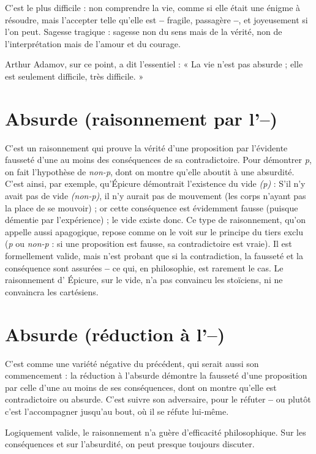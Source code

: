 C’est le plus difficile : non comprendre la vie, comme si elle était une
énigme à résoudre, mais l’accepter telle qu’elle est {\bf --} fragile, passagère {\bf --}, et
joyeusement si l’on peut. Sagesse tragique : sagesse non du sens mais de la
vérité, non de l'interprétation mais de l’amour et du courage.

Arthur Adamov, sur ce point, a dit l'essentiel : « La vie n’est pas absurde ;
elle est seulement difficile, très difficile. »

\section{Absurde (raisonnement par l'{\bf --})}
C'est un raisonnement qui prouve
la vérité d’une proposition par
l’évidente fausseté d’une au moins des conséquences de sa contradictoire.
Pour démontrer {\it p}, on fait l'hypothèse de {\it non-p}, dont on montre qu’elle
aboutit à une absurdité. C’est ainsi, par exemple, qu'Épicure démontrait
l'existence du vide {\it (p)} : S'il n’y avait pas de vide {\it (non-p)}, il n’y aurait pas de
mouvement (les corps n’ayant pas la place de se mouvoir) ; or cette conséquence
est évidemment fausse (puisque démentie par l’expérience) ; le vide
existe donc. Ce type de raisonnement, qu’on appelle aussi apagogique,
repose comme on le voit sur le principe du tiers exclu ({\it p} ou {\it non-p} : si une
proposition est fausse, sa contradictoire est vraie). Il est formellement valide,
mais n’est probant que si la contradiction, la fausseté et la conséquence sont
assurées {\bf --} ce qui, en philosophie, est rarement le cas. Le raisonnement
d’ Épicure, sur le vide, n’a pas convaincu les stoïciens, ni ne convaincra les
cartésiens.

\section{Absurde (réduction à l'{\bf --})}
C’est comme une variété négative du précédent,
qui serait aussi son commencement :
la réduction à l'absurde démontre la fausseté d’une proposition par celle
d’une au moins de ses conséquences, dont on montre qu’elle est contradictoire
ou absurde. C’est suivre son adversaire, pour le réfuter {\bf --} ou plutôt c’est
l’accompagner jusqu’au bout, où il se réfute lui-même.

Logiquement valide, le raisonnement n’a guère d’efficacité philosophique.
Sur les conséquences et sur l’absurdité, on peut presque toujours discuter.

